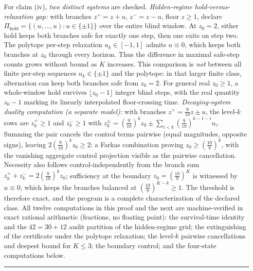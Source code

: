 \documentclass[11pt]{article}
\theoremstyle{definition}
\begin{document}
For claim (iv), \emph{two distinct systems} are checked.
\emph{Hidden-regime hold-versus-relaxation gap:} with branches
\(z^{+}=z+u\), \(z^{-}=z-u\), floor \(z\ge1\), declare
\(\Pi_{\mathrm{hold}}=\{(u,\ldots,u):u\in\{\pm1\}\}\) over the
entire blind window. At \(z_0=2\), either hold keeps both branches
safe for exactly one step, then one exits on step two. The polytope
per-step relaxation \(u_k\in[-1,1]\) admits \(u\equiv0\), which keeps
both branches at \(z_0\) through every horizon. Thus the difference
in maximal safe-step counts grows without bound as \(K\) increases.
This comparison is \emph{not} between all finite per-step sequences
\(u_k\in\{\pm1\}\) and the polytope: in that larger finite class,
alternation can keep both branches safe from \(z_0=2\).
For general real \(z_0\ge1\), a whole-window hold survives
\(\lfloor z_0-1\rfloor\) integer blind steps, with the real quantity
\(z_0-1\) marking its linearly interpolated floor-crossing time.
\emph{Decaying-system duality computation (a separate model):} with branches \(z^{+} = \tfrac{9}{10} z \pm u\), the
level-\(k\) rows are \(z^{+}_{k} \ge 1\) and \(z^{-}_{k} \ge 1\) with
\(z^{\pm}_{k} = (\tfrac{9}{10})^{k} z_{0} \pm \sum_{i<k} (\tfrac{9}{10})^{k-1-i} u_{i}\).
Summing the pair cancels the control terms pairwise (equal magnitudes, opposite signs),
leaving \(2 (\tfrac{9}{10})^{k} z_{0} \ge 2\): a Farkas combination proving
\(z_{0} \ge (\tfrac{10}{9})^{k}\), with the vanishing aggregate control projection visible
as the pairwise cancellation. Necessity also follows control-independently from the branch
sum \(z^{+}_{k} + z^{-}_{k} = 2 (\tfrac{9}{10})^{k} z_{0}\); sufficiency at the boundary
\(z_{0} = (\tfrac{10}{9})^{K}\) is witnessed by \(u \equiv 0\), which keeps the branches
balanced at \((\tfrac{10}{9})^{K-k} \ge 1\). The threshold is therefore exact, and the
program is a complete characterization of the declared class. All twelve computations in
this proof and the next are machine-verified in exact rational arithmetic (fractions, no
floating point): the survival-time identity and the \(42 = 30 + 12\) audit partition of the
hidden-regime grid; the extinguishing of the certificate under the polytope relaxation; the
level-\(k\) pairwise cancellations and deepest bound for \(K \le 3\); the boundary control;
and the four-state computations below.
\rule{0.5\linewidth}{0.5pt}
\end{document}
